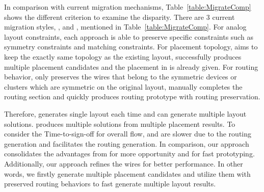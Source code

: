   In comparison with current migration mechanisms, Table~\ref{table:MigrateComp} shows the different criterion to examine the disparity. There are 3 current migration styles, \cite{msc-bhattacharya-tcad06}, \cite{ALP_YPWeng_iccad2011} and \cite{Chin_DMR_ICCAD2013}, mentioned in Table~\ref{table:MigrateComp}. For analog layout constraints, each approach is able to preserve specific constraints such as symmetry constraints and matching constraints. For placement topology, \cite{msc-bhattacharya-tcad06} aims to keep the exactly same topology as the existing layout, \cite{ALP_YPWeng_iccad2011} successfully produces multiple placement candidates and the placement in \cite{Chin_DMR_ICCAD2013} is already given. For routing behavior, \cite{msc-bhattacharya-tcad06} only preserves the wires that belong to the symmetric devices or clusters which are symmetric on the original layout, \cite{ALP_YPWeng_iccad2011} manually completes the routing section and \cite{Chin_DMR_ICCAD2013} quickly produces routing prototype with routing preservation. 

  Therefore, \cite{msc-bhattacharya-tcad06} generates single layout each time and \cite{ALP_YPWeng_iccad2011} can generate multiple layout solutions. \cite{Chin_DMR_ICCAD2013} produces multiple solutions from multiple placement results. To consider the Time-to-sign-off for overall flow, \cite{msc-bhattacharya-tcad06} and \cite{ALP_YPWeng_iccad2011} are slower due to the routing generation and \cite{Chin_DMR_ICCAD2013} facilitates the routing generation. In comparison, our approach consolidates the advantages from \cite{ALP_YPWeng_iccad2011} for more opportunity and \cite{Chin_DMR_ICCAD2013} for fast prototyping. Additionally, our approach refines the wires for better performance. In other words, we firstly generate multiple placement candidates and utilize them with preserved routing behaviors to fast generate multiple layout results. 

